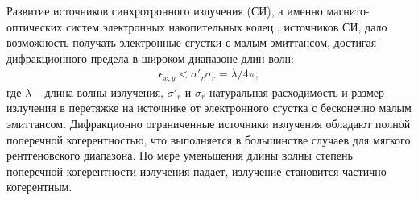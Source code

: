 

Развитие источников синхротронного излучения (СИ), а именно магнито-оптических систем электронных накопительных колец \cite{bartolini_challenges_2021}, \cite{hettel_challenges_2014} источников СИ, дало возможность получать электронные сгустки с малым эмиттансом, достигая дифракционного предела в широком диапазоне длин волн:
\begin{align}
	\epsilon_{x, y} < \sigma'_{r}\sigma_{r} = \lambda/4\pi,
	\label{eq:photons_emittance}
\end{align}
где $\lambda$ -- длина волны излучения, $\sigma'_{r}$ и $\sigma_{r}$ натуральная расходимость и размер излучения в перетяжке на источнике от электронного сгустка с бесконечно малым эмиттансом. Дифракционно ограниченные источники излучения обладают полной поперечной когерентностью, что выполняется в большинстве случаев для мягкого рентгеновского диапазона. По мере уменьшения длины волны степень поперечной когерентности излучения падает, излучение становится частично когерентным. 

